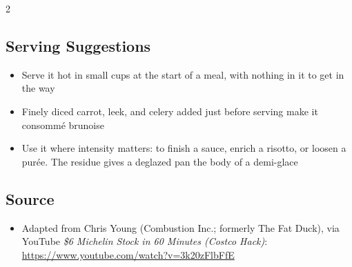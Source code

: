 \documentclass[11pt,letterpaper]{article}
\begin{document}
{\begin{multicols}{2}
\subsection*{Serving Suggestions}
\begin{itemize}
    \item Serve it hot in small cups at the start of a meal, with nothing in it to get in the way
    \item Finely diced carrot, leek, and celery added just before serving make it consomm\'e brunoise
    \item Use it where intensity matters: to finish a sauce, enrich a risotto, or loosen a pur\'ee. The residue gives a deglazed pan the body of a demi-glace
\end{itemize}

\subsection*{Source}
\begin{itemize}
    \item Adapted from Chris Young (Combustion Inc.; formerly The Fat Duck), via YouTube \textit{\$6 Michelin Stock in 60 Minutes (Costco Hack)}: \url{https://www.youtube.com/watch?v=3k20zFlbFfE}
\end{itemize}

\end{multicols}
}
\end{document}
